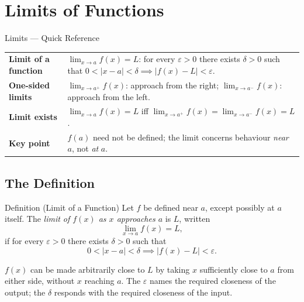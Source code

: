 
\section{Limits of Functions}

\begin{toolkitbox}{Limits --- Quick Reference}
\begin{tabular}{@{}p{}p{}@{}}
\textbf{Limit of a function} & $\lim_{x \to a} f(x) = L$: for every $\varepsilon > 0$ there exists $\delta > 0$ such that $0 < |x-a| < \delta \implies |f(x) - L| < \varepsilon$. \\[4pt]
\textbf{One-sided limits}    & $\lim_{x \to a^+} f(x)$: approach from the right; $\lim_{x \to a^-} f(x)$: approach from the left. \\[4pt]
\textbf{Limit exists}        & $\lim_{x \to a} f(x) = L$ iff $\lim_{x \to a^+} f(x) = \lim_{x \to a^-} f(x) = L$. \\[4pt]
\textbf{Key point}           & $f(a)$ need not be defined; the limit concerns behaviour \emph{near} $a$, not \emph{at} $a$. \\
\end{tabular}
\end{toolkitbox}

\subsection*{The Definition}

\begin{propositionbox}{Definition (Limit of a Function)}
Let $f$ be defined near $a$, except possibly at $a$ itself.
The \emph{limit of $f(x)$ as $x$ approaches $a$} is $L$, written
\[
  \lim_{x \to a} f(x) = L,
\]
if for every $\varepsilon > 0$ there exists $\delta > 0$ such that
\[
  0 < |x - a| < \delta \implies |f(x) - L| < \varepsilon.
\]
\end{propositionbox}

\begin{remark*}[Intuition]
$f(x)$ can be made arbitrarily close to $L$ by taking $x$
sufficiently close to $a$ from either side, without $x$ reaching $a$.
The $\varepsilon$ names the required closeness of the output;
the $\delta$ responds with the required closeness of the input.
\end{remark*}

